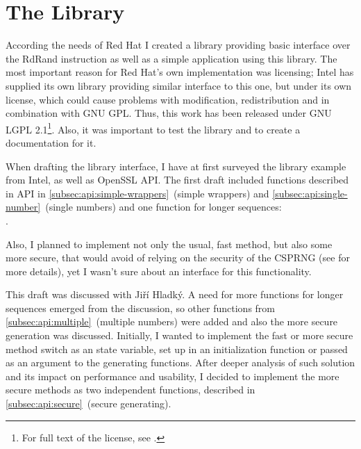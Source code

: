 \chapter{The Library}\label{chap:library}
\par{
According the needs of Red Hat I created a library providing basic interface over the RdRand instruction as well as a simple application using this library. The most important reason for Red Hat's own implementation was licensing; Intel has supplied its own library providing similar interface to this one, but under its own license, which could cause problems with modification, redistribution and in combination with GNU GPL. Thus, this work has been released under GNU LGPL 2.1\footnote{For full text of the license, see \cite{GNULGPL}.}. Also, it was important to test the library and to create a documentation for it.
}

\par{
When drafting the library interface, I have at first surveyed the library example from Intel\cite{IntelDRNGGuide}, as well as OpenSSL API\cite{OpenSSLAPI}. The first draft included functions described in API in \ref{subsec:api:simple-wrappers}~(simple wrappers) and \ref{subsec:api:single-number}~(single numbers) and one function for longer sequences: \\. 
}

\par{
Also, I planned to implement not only the usual, fast method, but also some more secure, that would avoid of relying on the security of the CSPRNG (see  for more details), yet I wasn't sure about an interface for this functionality.
}

\par{
This draft was discussed with Jiří Hladký. A need for more functions for longer sequences emerged from the discussion, so other functions from \ref{subsec:api:multiple}~(multiple numbers) were added and also the more secure generation was discussed. Initially, I wanted to implement the fast or more secure method switch as an state variable, set up in an initialization function or passed as an argument to the generating functions. After deeper analysis of such solution and its impact on performance and usability, I decided to implement the more secure methods as two independent functions, described in \ref{subsec:api:secure}~(secure generating).  
}

